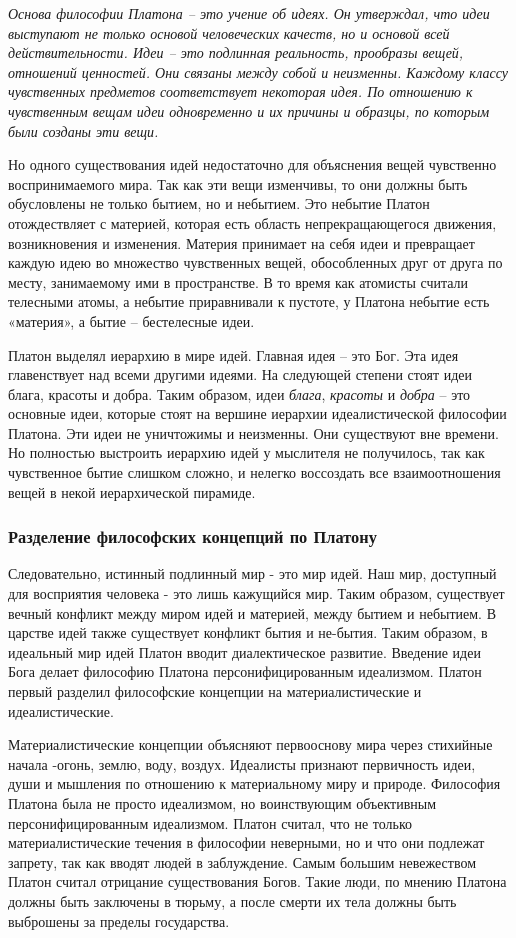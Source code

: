 \documentclass[a4paper, 14pt]{extreport}
\begin{document}
\emph{Основа философии Платона -- это учение об идеях. Он утверждал, что
идеи выступают не только основой человеческих качеств, но и основой всей
действительности. Идеи -- это подлинная реальность, прообразы вещей,
отношений ценностей. Они связаны между собой и неизменны. Каждому классу
чувственных предметов соответствует некоторая идея. По отношению к
чувственным вещам идеи одновременно и их причины и образцы, по которым
были созданы эти вещи.}

Но одного существования идей недостаточно для объяснения вещей
чувственно воспринимаемого мира. Так как эти вещи изменчивы, то они
должны быть обусловлены не только бытием, но и небытием. Это небытие
Платон отождествляет с материей, которая есть область непрекращающегося
движения, возникновения и изменения. Материя принимает на себя идеи и
превращает каждую идею во множество чувственных вещей, обособленных друг
от друга по месту, занимаемому ими в пространстве. В то время как
атомисты считали телесными атомы, а небытие приравнивали к пустоте, у
Платона небытие есть «материя», а бытие -- бестелесные идеи.

Платон выделял иерархию в мире идей. Главная идея -- это Бог. Эта идея
главенствует над всеми другими идеями. На следующей степени стоят идеи
блага, красоты и добра. Таким образом, идеи \emph{блага}, \emph{красоты}
и \emph{добра} -- это основные идеи, которые стоят на вершине иерархии
идеалистической философии Платона. Эти идеи не уничтожимы и неизменны.
Они существуют вне времени. Но полностью выстроить иерархию идей у
мыслителя не получилось, так как чувственное бытие слишком сложно, и
нелегко воссоздать все взаимоотношения вещей в некой иерархической
пирамиде.

\subsubsection{Разделение философских концепций по Платону}

Следовательно, истинный подлинный мир - это мир идей. Наш мир, доступный
для восприятия человека - это лишь кажущийся мир. Таким образом,
существует вечный конфликт между миром идей и материей, между бытием и
небытием. В царстве идей также существует конфликт бытия и не-бытия.
Таким образом, в идеальный мир идей Платон вводит диалектическое
развитие. Введение идеи Бога делает философию Платона
персонифицированным идеализмом. Платон первый разделил философские
концепции на материалистические и идеалистические.

Материалистические концепции объясняют первооснову мира через стихийные
начала -огонь, землю, воду, воздух. Идеалисты признают первичность идеи,
души и мышления по отношению к материальному миру и природе. Философия
Платона была не просто идеализмом, но воинствующим объективным
персонифицированным идеализмом. Платон считал, что не только
материалистические течения в философии неверными, но и что они подлежат
запрету, так как вводят людей в заблуждение. Самым большим невежеством
Платон считал отрицание существования Богов. Такие люди, по мнению
Платона должны быть заключены в тюрьму, а после смерти их тела должны
быть выброшены за пределы государства.
\end{document}
